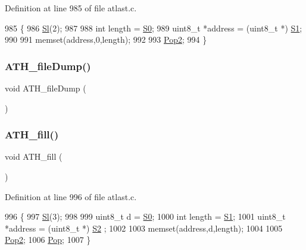 Definition at line 985 of file atlast.\+c.


\begin{DoxyCode}
985                  \{
986     \hyperlink{atldef_8h_a5926d5feea48dfae9eef1fb4e2bdb5fa}{Sl}(2);
987 
988     \textcolor{keywordtype}{int} length = \hyperlink{atldef_8h_a5cfab9793f7fd3ac4ab45eff41df9f37}{S0};
989     uint8\_t *address = (uint8\_t *) \hyperlink{atldef_8h_a690d30e9ad3647835c243368b36d4c41}{S1};
990 
991     memset(address,0,length);
992 
993     \hyperlink{atldef_8h_aa25c480f1a1ad10fdb756d8fd02a98ea}{Pop2};
994 \}
\end{DoxyCode}
\mbox{\label{group__FileUrilities_gae38f94a56afc0ead3a5549bdba1b2df9}} 
\subsubsection{\texorpdfstring{A\+T\+H\+\_\+file\+Dump()}{ATH\_fileDump()}}
{\footnotesize\ttfamily void A\+T\+H\+\_\+file\+Dump (\begin{DoxyParamCaption}{ }\end{DoxyParamCaption})}

\mbox{\label{group__FileUrilities_ga67975f3222fec3ffefd7ba74669464bb}} 
\subsubsection{\texorpdfstring{A\+T\+H\+\_\+fill()}{ATH\_fill()}}
{\footnotesize\ttfamily void A\+T\+H\+\_\+fill (\begin{DoxyParamCaption}{ }\end{DoxyParamCaption})}



Definition at line 996 of file atlast.\+c.


\begin{DoxyCode}
996                 \{
997     \hyperlink{atldef_8h_a5926d5feea48dfae9eef1fb4e2bdb5fa}{Sl}(3);
998 
999     uint8\_t d = \hyperlink{atldef_8h_a5cfab9793f7fd3ac4ab45eff41df9f37}{S0};
1000     \textcolor{keywordtype}{int} length = \hyperlink{atldef_8h_a690d30e9ad3647835c243368b36d4c41}{S1};
1001     uint8\_t *address = (uint8\_t *) \hyperlink{atldef_8h_ad5e70dee3c36d645b0eb1743b8a7d2bf}{S2} ;
1002 
1003     memset(address,d,length);
1004 
1005     \hyperlink{atldef_8h_aa25c480f1a1ad10fdb756d8fd02a98ea}{Pop2};
1006     \hyperlink{atldef_8h_ad590ef6976fe2df5123108916638a353}{Pop};
1007 \}
\end{DoxyCode}
